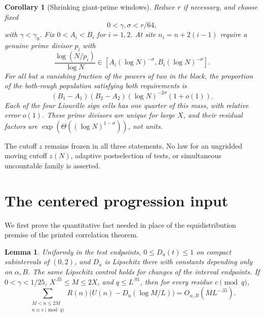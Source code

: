 \documentclass[11pt]{article}
\newtheorem{lemma}[theorem]{Lemma}
\newtheorem{corollary}[theorem]{Corollary}
\theoremstyle{remark}\newtheorem{remark}[theorem]{Remark}
\begin{document}
\begin{corollary}[Shrinking giant-prime windows]\label{cor:giants}
Reduce $r$ if necessary, and choose fixed
\[
       0<\gamma,\sigma<r/64,
\]
with $\gamma<\gamma_0$. Fix $0<A_i<B_i$ for $i=1,2$.
At site $n_i=n+2(i-1)$ require a genuine prime divisor $p_i$ with
\begin{equation}\label{eq:giant-window}
 \frac{\log(N/p_i)}{\log N}
       \in[A_i(\log N)^{-\sigma},B_i(\log N)^{-\sigma}].
\end{equation}
For all but a vanishing fraction of the powers of two in the block,
the proportion of the both-rough population satisfying both requirements is
\[
 (B_1-A_1)(B_2-A_2)(\log N)^{-2\sigma}(1+o(1)).
\]
Each of the four Liouville sign cells has one quarter of this mass,
with relative error $o(1)$. These prime divisors are unique for large
$X$, and their residual factors are
$\exp(\Theta((\log N)^{1-\sigma}))$, not units.
\end{corollary}

The cutoff $z$ remains frozen in all three statements. No law for an
ungridded moving cutoff $z(N)$, adaptive postselection of tests, or
simultaneous uncountable family is asserted.

\section{The centered progression input}
We first prove the quantitative fact needed in place of the
equidistribution premise of the printed correlation theorem.

\begin{lemma}\label{lem:one-site}
Uniformly in the test endpoints, $0\le D_u(t)\le1$ on compact
subintervals of $(0,2)$, and $D_u$ is Lipschitz there with constants
depending only on $\alpha,B$. The same Lipschitz control holds for
changes of the interval endpoints.
If $0<\gamma<1/25$, $X^{.35}\le M\le2X$, and $q\le L^{.01}$, then
for every residue $c\pmod q$,
\begin{equation}\label{eq:center-AP}
 \sum_{\substack{M<n\le2M\\n\equiv c\pmod q}}
       R(n)\bigl(U(n)-D_u(\log M/L)\bigr)
                    =O_{\alpha,B}(ML^{-.35}).
\end{equation}
\end{lemma}
\end{document}
